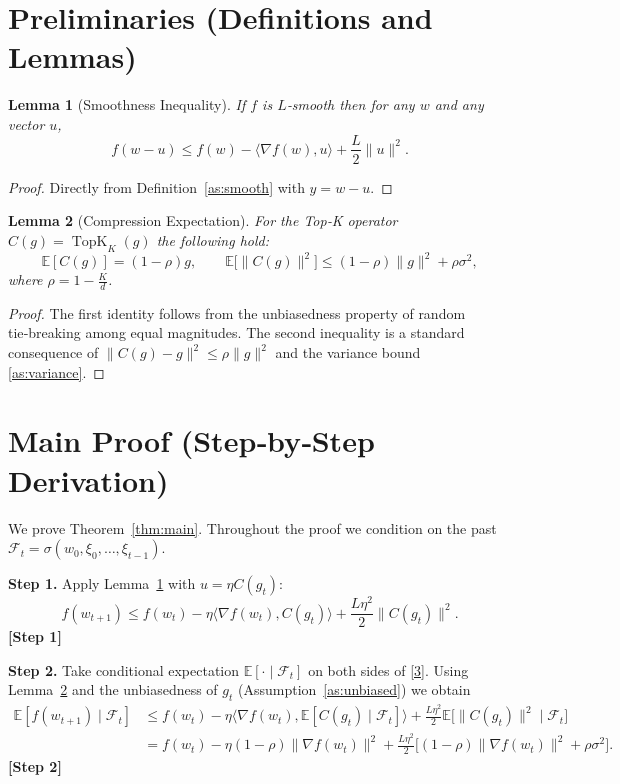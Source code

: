 \documentclass{article}
\newtheorem{lemma}{Lemma}
\newcommand{\TopK}[2]{\operatorname{TopK}_{#1}(#2)} %
\begin{document}
\newpage

\section*{Preliminaries (Definitions and Lemmas)}
\begin{lemma}[Smoothness Inequality]\label{lem:smooth}
If $f$ is $L$‑smooth then for any $w$ and any vector $u$,
\[
f(w-u)\le f(w)-\langle\nabla f(w),u\rangle+\frac{L}{2}\|u\|^{2}.
\]
\end{lemma}
\begin{proof}
Directly from Definition~\ref{as:smooth} with $y=w-u$.
\end{proof}

\begin{lemma}[Compression Expectation]\label{lem:compress}
For the Top‑K operator $C(g)=\TopK{K}{g}$ the following hold:
\[
\mathbb{E}[C(g)]= (1-\rho)g,\qquad
\mathbb{E}\big[\|C(g)\|^{2}\big]\le (1-\rho)\|g\|^{2}+\rho\sigma^{2},
\]
where $\rho=1-\frac{K}{d}$.
\end{lemma}
\begin{proof}
The first identity follows from the unbiasedness property of random tie‑breaking among equal magnitudes.  
The second inequality is a standard consequence of $\|C(g)-g\|^{2}\le\rho\|g\|^{2}$ and the variance bound \ref{as:variance}.
\end{proof}

\newpage

\section*{Main Proof (Step‑by‑Step Derivation)}
We prove Theorem~\ref{thm:main}.  Throughout the proof we condition on the past $\mathcal{F}_t=\sigma(w_0,\xi_0,\dots,\xi_{t-1})$.

\noindent\textbf{Step 1.} Apply Lemma~\ref{lem:smooth} with $u=\eta C(g_t)$:
\[
f(w_{t+1})\le f(w_t)-\eta\langle\nabla f(w_t),C(g_t)\rangle+\frac{L\eta^{2}}{2}\|C(g_t)\|^{2}. \tag{3}
\]
\textbf{[Step 1]}

\noindent\textbf{Step 2.} Take conditional expectation $\mathbb{E}[\cdot\mid\mathcal{F}_t]$ on both sides of \eqref{3}.  Using Lemma~\ref{lem:compress} and the unbiasedness of $g_t$ (Assumption~\ref{as:unbiased}) we obtain
\[
\begin{aligned}
\mathbb{E}[f(w_{t+1})\mid\mathcal{F}_t]
&\le f(w_t)-\eta\Big\langle\nabla f(w_t),\mathbb{E}[C(g_t)\mid\mathcal{F}_t]\Big\rangle
   +\frac{L\eta^{2}}{2}\mathbb{E}\big[\|C(g_t)\|^{2}\mid\mathcal{F}_t\big]\\
&= f(w_t)-\eta(1-\rho)\|\nabla f(w_t)\|^{2}
   +\frac{L\eta^{2}}{2}\Big[(1-\rho)\|\nabla f(w_t)\|^{2}+\rho\sigma^{2}\Big].
\end{aligned}
\tag{4}
\]
\textbf{[Step 2]}
\end{document}
